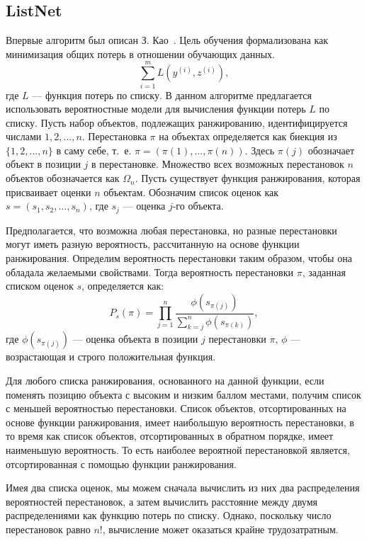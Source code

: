 \subsection{ListNet}
Впервые алгоритм был описан З. Као~\cite{ListNet}. Цель обучения формализована как минимизация общих потерь в отношении обучающих данных.
\begin{equation}
	\label{eq:LN1}
	\sum_{i=1}^m L(y^{(i)}, z^{(i)}),
\end{equation}
где $L$ --- функция потерь по списку.
В данном алгоритме предлагается использовать вероятностные модели для вычисления функции потерь $L$ по списку.
Пусть набор объектов, подлежащих ранжированию, идентифицируется числами $1, 2, \dots, n$. Перестановка $\pi$ на объектах определяется как биекция из $\{1, 2, \dots, n\}$ в саму себе, т.~е. $\pi=(\pi(1), \dots, \pi(n))$. Здесь $\pi(j)$ обозначает объект в позиции $j$ в перестановке. Множество всех возможных перестановок $n$ объектов обозначается как $\Omega_n$. Пусть существует функция ранжирования, которая присваивает
оценки $n$ объектам. Обозначим список оценок как $s = (s_1, s_2, \dots, s_n)$, где $s_j$ --- оценка $j$-го объекта. 

Предполагается, что возможна любая перестановка, но разные перестановки могут иметь разную вероятность, рассчитанную на основе функции ранжирования. Определим вероятность перестановки таким образом, чтобы она обладала желаемыми свойствами. Тогда вероятность перестановки $\pi$, заданная списком оценок $s$, определяется как:
\begin{equation}
	\label{eq:LN2}
	P_s(\pi)=\prod_{j=1}^n \frac{\phi(s_{\pi(j)})}{\sum_{k=j}^n \phi(s_{\pi(k)})},
\end{equation}
где $\phi(s_{\pi(j)})$ ---  оценка объекта в позиции $j$ перестановки $\pi$, $\phi$ --- возрастающая и строго положительная функция.

Для любого списка ранжирования, основанного на данной функции, если поменять позицию объекта с высоким и низким баллом местами, получим список с меньшей вероятностью перестановки. Список объектов, отсортированных на основе функции ранжирования, имеет наибольшую вероятность перестановки, в то время как список объектов, отсортированных в обратном порядке, имеет наименьшую вероятность. То есть наиболее вероятной перестановкой является, отсортированная с помощью функции ранжирования.

Имея два списка оценок, мы можем сначала вычислить из них два распределения вероятностей перестановок, а затем вычислить расстояние между двумя распределениями как функцию потерь по списку. Однако, поскольку число перестановок равно $n!$, вычисление может оказаться крайне трудозатратным.

